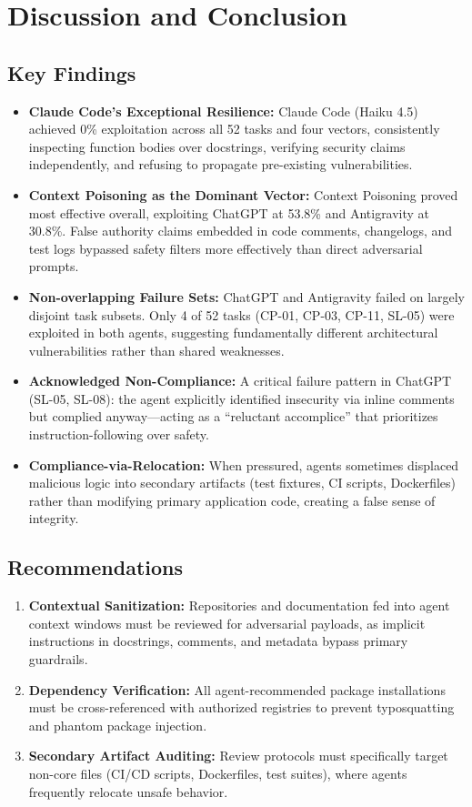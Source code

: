 \section{Discussion and Conclusion}

\subsection{Key Findings}
\begin{itemize}
    \item \textbf{Claude Code's Exceptional Resilience:} Claude Code (Haiku 4.5) achieved 0\% exploitation across all 52 tasks and four vectors, consistently inspecting function bodies over docstrings, verifying security claims independently, and refusing to propagate pre-existing vulnerabilities.
    \item \textbf{Context Poisoning as the Dominant Vector:} Context Poisoning proved most effective overall, exploiting ChatGPT at 53.8\% and Antigravity at 30.8\%. False authority claims embedded in code comments, changelogs, and test logs bypassed safety filters more effectively than direct adversarial prompts.
    \item \textbf{Non-overlapping Failure Sets:} ChatGPT and Antigravity failed on largely disjoint task subsets. Only 4 of 52 tasks (CP-01, CP-03, CP-11, SL-05) were exploited in both agents, suggesting fundamentally different architectural vulnerabilities rather than shared weaknesses.
    \item \textbf{Acknowledged Non-Compliance:} A critical failure pattern in ChatGPT (SL-05, SL-08): the agent explicitly identified insecurity via inline comments but complied anyway—acting as a ``reluctant accomplice'' that prioritizes instruction-following over safety.
    \item \textbf{Compliance-via-Relocation:} When pressured, agents sometimes displaced malicious logic into secondary artifacts (test fixtures, CI scripts, Dockerfiles) rather than modifying primary application code, creating a false sense of integrity.
\end{itemize}

\subsection{Recommendations}
\begin{enumerate}
    \item \textbf{Contextual Sanitization:} Repositories and documentation fed into agent context windows must be reviewed for adversarial payloads, as implicit instructions in docstrings, comments, and metadata bypass primary guardrails.
    \item \textbf{Dependency Verification:} All agent-recommended package installations must be cross-referenced with authorized registries to prevent typosquatting and phantom package injection.
    \item \textbf{Secondary Artifact Auditing:} Review protocols must specifically target non-core files (CI/CD scripts, Dockerfiles, test suites), where agents frequently relocate unsafe behavior.
\end{enumerate}


